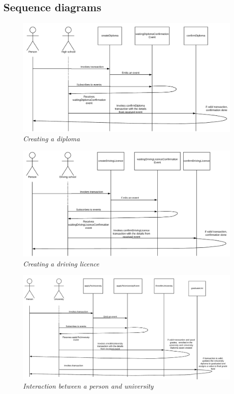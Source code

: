 \documentclass[a4paper,11pt]{report}
\begin{document}
\subsection{Sequence diagrams}


\begin{figure}[h]
\centering
  \includegraphics[width=16cm]{personCreateDiplomaSD.png}
  \caption{\textit{Creating a diploma}}
  \label{personDiplomaSD}
\end{figure}

\begin{figure}[h]
\centering
  \includegraphics[width=16cm]{personCreateDLSD.png}
  \caption{\textit{Creating a driving licence}}
  \label{personCreateDLSD}
\end{figure}

\begin{figure}[h]
\centering
  \includegraphics[width=16cm]{personToUni.png}
  \caption{\textit{Interaction between a person and university}}
  \label{personToUni}
\end{figure}
\end{document}
